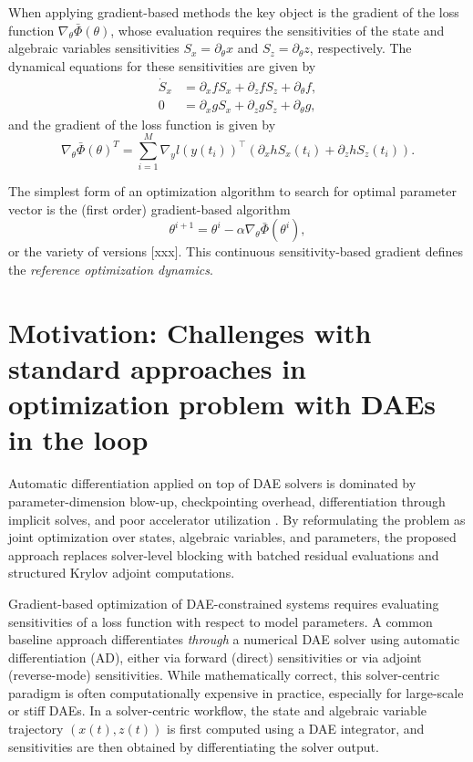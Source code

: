 When applying gradient-based methods the key object is the gradient of the loss function $\nabla_\theta \bar\Phi(\theta)$, whose evaluation requires the sensitivities of the state and algebraic variables sensitivities $S_{{x}}=\partial_{\theta} {x}$ and $S_{ z}=\partial_{\theta} {z}$, respectively. The dynamical equations for these sensitivities are given by 
\begin{align}
\dot S_{ x} &= \partial_x {f} S_{ x} + { \partial_z {f}} S_{ z} +  \partial_{\theta} {f}, \\
0 &= \partial_x {g}S_{ x} + \partial_z {g} S_{ z} + \partial_{\theta}g,
\end{align}
and the gradient of the loss function is given by
\begin{equation}
\nabla_\theta \bar\Phi({\theta})^T
=
\sum_{i=1}^M
\nabla_y l({y}(t_i))^\top
\left(
 \partial_{x}h S_{ x}(t_i) +\partial_{z} h S_{ z}(t_i)
\right).
\end{equation}

The simplest form of an optimization algorithm to search for optimal parameter vector is the (first order) gradient-based algorithm 
\begin{equation}
{\theta}^{i+1} = {\theta}^i - \alpha \nabla_{ \theta} \bar\Phi({\theta}^i),
\end{equation}
or the variety of versions [xxx]. This continuous sensitivity-based gradient defines the \emph{reference
optimization dynamics}. 


\section{Motivation: Challenges with standard approaches in optimization problem with DAEs in the loop}
\label{sec:ad_vs_residual_optimization}
Automatic differentiation applied on top of DAE solvers is dominated by parameter-dimension blow-up, checkpointing overhead, differentiation through implicit solves, and poor accelerator utilization \cite{hindmarsh2005sundials,griewank2000revolve,chen2018neuralode}.
By reformulating the problem as joint optimization over states, algebraic variables, and parameters, the proposed approach replaces solver-level blocking with batched residual evaluations and structured Krylov adjoint computations.


Gradient-based optimization of DAE-constrained systems requires evaluating sensitivities of a loss function with respect to model parameters.
A common baseline approach differentiates \emph{through} a numerical DAE solver using automatic differentiation (AD), either via forward (direct) sensitivities or via adjoint (reverse-mode) sensitivities. While mathematically correct, this solver-centric paradigm is often computationally expensive in practice, especially for large-scale or stiff DAEs. In a solver-centric workflow, the state and algebraic variable trajectory $(x(t),z(t))$ is first computed using a DAE integrator, and sensitivities are then obtained by differentiating the solver output.

